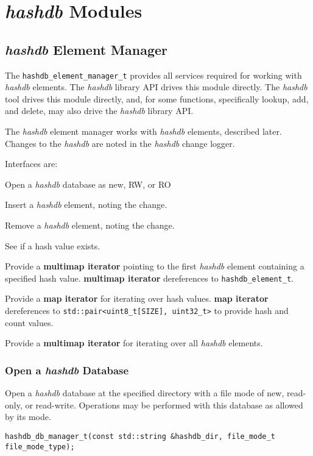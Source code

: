 \documentclass[12pt,twoside]{article}
\newcommand{\hdb}{\emph{hashdb}\xspace}
\newcommand{\mi}{\textbf{map iterator}\xspace}
\newcommand{\mmi}{\textbf{multimap iterator}\xspace}
\begin{document}
\section{\hdb Modules}
\subsection{\hdb Element Manager}
The \texttt{hashdb\_element\_manager\_t}
provides all services required for working with \hdb elements.
The \hdb library API drives this module directly.
The \hdb tool drives this module directly,
and, for some functions, specifically lookup, add, and delete,
may also drive the \hdb library API.

The \hdb element manager works with \hdb elements, described later.
Changes to the \hdb are noted in the \hdb change logger.

Interfaces are:
\begin{compactitem}
\item Open a \hdb database as new, RW, or RO
\item Insert a \hdb element, noting the change.
\item Remove a \hdb element, noting the change.
\item See if a hash value exists.
\item Provide a \mmi pointing to the first \hdb element
containing a specified hash value.
\mmi dereferences to \texttt{hashdb\_element\_t}.
\item Provide a \mi for iterating over hash values.
\mi dereferences to \texttt{std::pair<uint8\_t[SIZE], uint32\_t>}
to provide hash and count values.
\item Provide a \mmi for iterating over all \hdb elements.
\end{compactitem}

\subsubsection{Open a \hdb Database}
Open a \hdb database at the specified directory
with a file mode of new, read-only, or read-write.
Operations may be performed with this database as allowed by its mode.

\begin{small}
\begin{verbatim}
hashdb_db_manager_t(const std::string &hashdb_dir, file_mode_t file_mode_type);
\end{verbatim}
\end{small}
\end{document}
